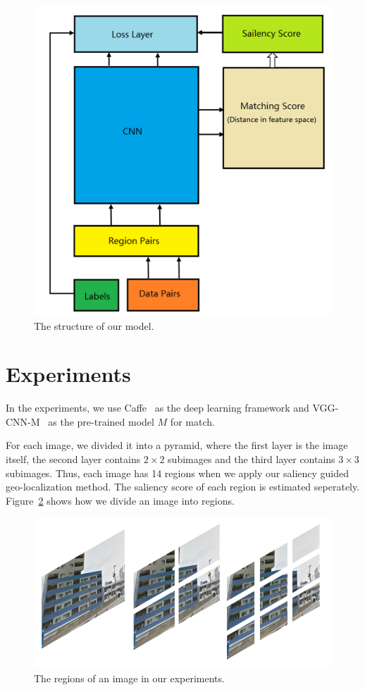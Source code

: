 \begin{figure}
\includegraphics[width=0.9\linewidth]{img/structure}
\caption{The structure of our model.}
\label{fig:network}
\end{figure}

\section{Experiments}
\par
In the experiments, we use Caffe~\cite{jia2014caffe} as the deep learning framework and VGG-CNN-M~\cite{chatfield2014return} as the pre-trained model $M$ for match. 
\par
For each image, we divided it into a pyramid, where the first layer is the image itself, the second layer contains $2 \times 2$ subimages and the third layer contains $3 \times 3$ subimages. Thus, each image has 14 regions when we apply our saliency guided geo-localization method. The saliency score of each region is estimated seperately. Figure~\ref{fig:pyramid} shows how we divide an image into regions. 
\begin{figure}
\includegraphics*[width=0.9\linewidth]{img/regions}
\caption{The regions of an image in our experiments.}
\label{fig:pyramid}
\end{figure}
